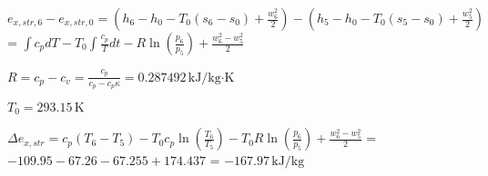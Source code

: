 \( e_{x,str,6} - e_{x,str,0} = (h_6 - h_0 - T_0(s_6 - s_0) + \frac{w_6^2}{2}) - (h_5 - h_0 - T_0(s_5 - s_0) + \frac{w_5^2}{2}) \)  
= \( \int c_p dT - T_0 \int \frac{c_p}{T} dt - R \ln \left(\frac{p_6}{p_5}\right) + \frac{w_6^2 - w_5^2}{2} \)  

\( R = c_p - c_v = \frac{c_p}{c_p - c_p \kappa} = 0.287492 \, \text{kJ/kg·K} \)  

\( T_0 = 293.15 \, \text{K} \)  

\( \Delta e_{x,str} = c_p(T_6 - T_5) - T_0 c_p \ln \left(\frac{T_6}{T_5}\right) - T_0 R \ln \left(\frac{p_6}{p_5}\right) + \frac{w_6^2 - w_5^2}{2} \)  
= \( -109.95 - 67.26 - 67.255 + 174.437 \)  
= \( -167.97 \, \text{kJ/kg} \)
